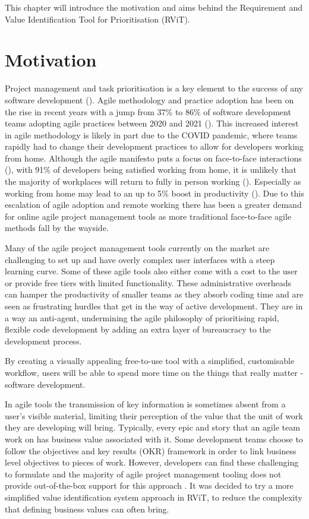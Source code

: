 \documentclass[l4proj.tex]{subfiles}
\begin{document}
  

This chapter will introduce the motivation and aims behind the Requirement and Value Identification Tool for Prioritisation (RViT).

\section{Motivation}

Project management and task prioritisation is a key element to the success of any software development (\cite{Verner2005}). Agile methodology and practice adoption has been on the rise in recent years with a jump from 37$\%$ to 86$\%$ of software development teams adopting agile practices between 2020 and 2021 (\cite{Knaster2023}). This increased interest in agile methodology is likely in part due to the COVID pandemic, where teams rapidly had to change their development practices to allow for developers working from home.   Although the agile manifesto puts a focus on face-to-face interactions (\cite{Kent2001}), with 91$\%$ of developers being satisfied working from home, it is unlikely that the majority of workplaces will return to fully in person working (\cite{Ramírez2022}). Especially as working from home may lead to an up to 5$\%$ boost in productivity (\cite{Barrero2021}). Due to this escalation of agile adoption and remote working there has been a greater demand for online agile project management tools as more traditional face-to-face agile methods fall by the wayside.

Many of the agile project management tools currently on the market are challenging to set up and have overly complex user interfaces with a steep learning curve. Some of these agile tools also either come with a cost to the user or provide free tiers with limited functionality. These administrative overheads can hamper the productivity of smaller teams as they absorb coding time and are seen as frustrating hurdles that get in the way of active development. They are in a way an anti-agent, undermining the agile philosophy of prioritising rapid, flexible code development by adding an extra layer of bureaucracy to the development process.

By creating a visually appealing free-to-use tool with a simplified, customisable workflow, users will be able to spend more time on the things that really matter - software development.

In agile tools the transmission of key information is sometimes absent from a user's visible material, limiting their perception of the value that the unit of work they are developing will bring. Typically, every epic and story that an agile team work on has business value associated with it. Some development teams choose to follow the objectives and key results (OKR) framework in order to link business level objectives to pieces of work. However, developers can find these challenging to formulate and the majority of agile project management tooling does not provide out-of-the-box support for this approach \cite{Stray2022}. It was decided to try a more simplified value identification system approach in RViT, to reduce the complexity that defining business values can often bring.
\end{document}
